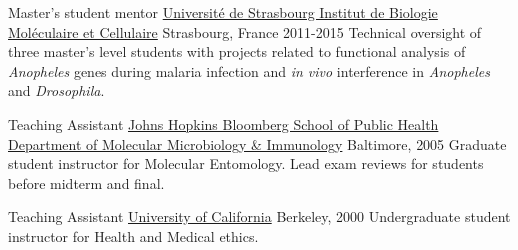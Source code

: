 \begin{cventries}

	\cventry
		{Master's student mentor}
		{\href{http://www-ibmc.u-strasbg.fr/}{Universit\'{e} de Strasbourg \newline Institut de Biologie Mol\'{e}culaire et Cellulaire}}
		{Strasbourg, France}
		{2011-2015}
		{Technical oversight of three master's level students with projects related to functional analysis of \emph{Anopheles} genes during malaria infection and \emph{in vivo}  interference in \emph{Anopheles} and \emph{Drosophila}.}

	\cventry
		{Teaching Assistant}
		{\href{http://www.jhsph.edu/}{Johns Hopkins Bloomberg School of Public Health \newline Department of Molecular Microbiology \& Immunology}}
		{Baltimore, }
		{2005}
		{Graduate student instructor for Molecular Entomology. Lead exam reviews for students before midterm and final.}

	\cventry
		{Teaching Assistant}
		{\href{http://www.berkeley.edu/}{University of California}}
		{Berkeley, }
		{2000}
		{Undergraduate student instructor for Health and Medical ethics.}

\end{cventries}
